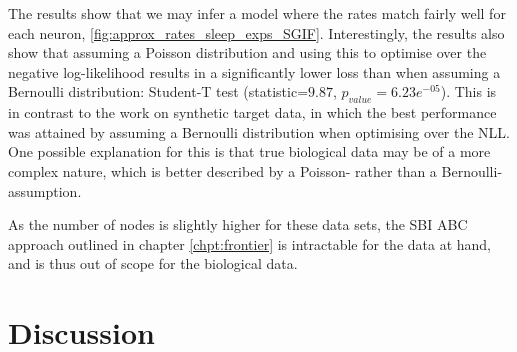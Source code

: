 \documentclass[mphil,deptreport,ianc]{infthesis} %
\begin{document}
The results show that we may infer a model where the rates match fairly well for each neuron, \ref{fig:approx_rates_sleep_exps_SGIF}.
Interestingly, the results also show that assuming a Poisson distribution and using this to optimise over the negative log-likelihood results in a significantly lower loss than when assuming a Bernoulli distribution: Student-T test (statistic=$9.87$, $p_{value}=6.23e^{-05}$).
This is in contrast to the work on synthetic target data, in which the best performance was attained by assuming a Bernoulli distribution when optimising over the NLL.
One possible explanation for this is that true biological data may be of a more complex nature, which is better described by a Poisson- rather than a Bernoulli-assumption.

 
 
 
 
 
 
 

As the number of nodes is slightly higher for these data sets, the SBI ABC approach outlined in chapter \ref{chpt:frontier} is intractable for the data at hand, and is thus out of scope for the biological data. 


\section{Discussion}
\end{document}
